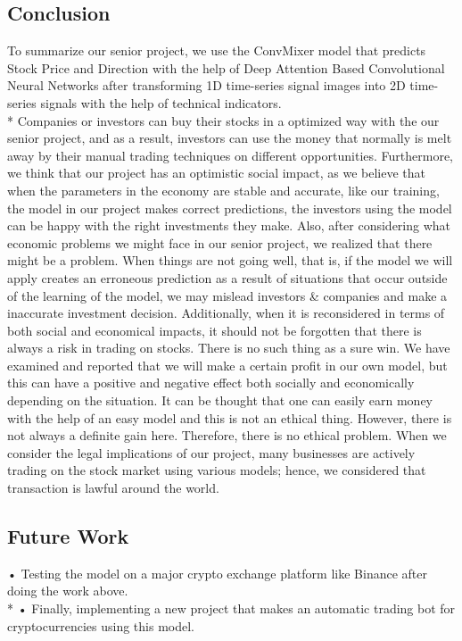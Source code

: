 \documentclass[]{article}
\begin{document}
\subsection{Conclusion}
To summarize our senior project, we use the ConvMixer model that predicts Stock Price and Direction with the help of Deep Attention Based Convolutional Neural Networks after transforming 1D time-series signal images into 2D time-series signals with the help of technical indicators. \vspace{0.4cm} \\*
Companies or investors can buy their stocks in a optimized way with the our senior project, and as a result, investors can use the money that normally is melt away by their manual trading techniques on different opportunities. Furthermore, we think that our project has an optimistic social impact, as we believe that when the parameters in the economy are stable and accurate, like our training, the model in our project makes correct predictions, the investors using the model can be happy with the right investments they make. Also, after considering what economic problems we might face in our senior project, we realized that there might be a problem. When things are not going well, that is, if the model we will apply creates an erroneous prediction as a result of situations that occur outside of the learning of the model, we may mislead investors \& companies and make a inaccurate investment decision. Additionally, when it is reconsidered in terms of both social and economical impacts, it should not be forgotten that there is always a risk in trading on stocks. There is no such thing as a sure win. We have examined and reported that we will make a certain profit in our own model, but this can have a positive and negative effect both socially and economically depending on the situation. It can be thought that one can easily earn money with the help of an easy model and this is not an ethical thing. However, there is not always a definite gain here. Therefore, there is no ethical problem. When we consider the legal implications of our project, many businesses are actively trading on the stock market using various models; hence, we considered that transaction is lawful around the world. 

\subsection{Future Work}
• Testing the model on a major crypto exchange platform like Binance after doing the work above.\\*
• Finally, implementing a new project that makes an automatic trading bot for cryptocurrencies using this model.
\end{document}
